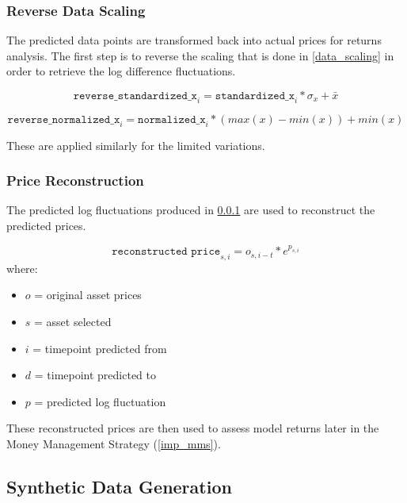 \documentclass[a4paper,11pt,oneside]{article}
\theoremstyle{plain}
\theoremstyle{definition}
\begin{document}
\subsubsection{Reverse Data Scaling}\label{data_reverse_scaling}

The predicted data points are transformed back into actual prices for returns analysis. The first step is to reverse the scaling that is done in \ref{data_scaling} in order to retrieve the log difference fluctuations.

\begin{equation}
\texttt{reverse\_standardized\_x}_i = \texttt{standardized\_x}_i * \sigma_x + \bar{x}
\end{equation}

\begin{equation}
\texttt{reverse\_normalized\_x}_i = \texttt{normalized\_x}_i * (max(x) - min(x)) + min(x)
\end{equation}

These are applied similarly for the limited variations.

\subsubsection{Price Reconstruction}\label{data_price_recon}

The predicted log fluctuations produced in \ref{data_reverse_scaling} are used to reconstruct the predicted prices. 

\begin{equation}
\texttt{reconstructed price}_{s,i} = o_{s,i-t} * e^{p_{s,i}}
\end{equation}
where:
\begin{itemize}
	\item [] $o$ = original asset prices
	\item [] $s$ = asset selected
	\item [] $i$ = timepoint predicted from
	\item [] $d$ = timepoint predicted to
	\item [] $p$ = predicted log fluctuation 
 
\end{itemize}
\texttt{}\newline
These reconstructed prices are then used to assess model returns later in the Money Management Strategy (\ref{imp_mms}).

\subsection{Synthetic Data Generation}\label{data_synthetic}
\end{document}
